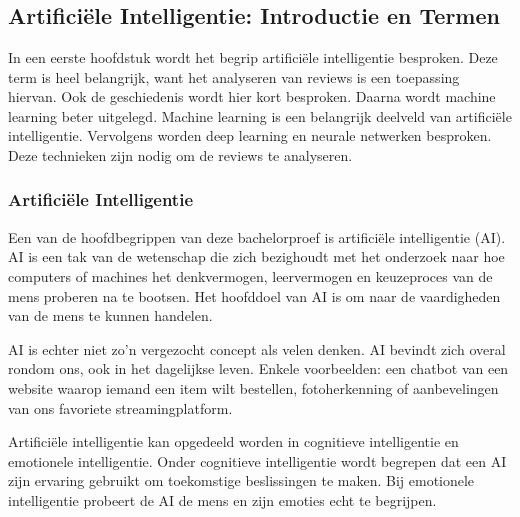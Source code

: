\chapter{}
\label{ch:stand-van-zaken}




\section{Artificiële Intelligentie: Introductie en Termen}
\label{sec:artificiëleintelligentieintroductie}
In een eerste hoofdstuk wordt het begrip artificiële intelligentie besproken. Deze term is heel belangrijk, want het analyseren van reviews is een toepassing hiervan. Ook de geschiedenis wordt hier kort besproken. Daarna wordt machine learning beter uitgelegd. Machine learning is een belangrijk deelveld van artificiële intelligentie. Vervolgens worden deep learning en neurale netwerken besproken. Deze technieken zijn nodig om de reviews te analyseren. 

\subsection{Artificiële Intelligentie}
\label{sec:artificiëleintelligentie}
Een van de hoofdbegrippen van deze bachelorproef is artificiële intelligentie (AI). \gls{AI} is een tak van de wetenschap die zich bezighoudt met het onderzoek naar hoe computers of machines het denkvermogen, leervermogen en keuzeproces van de mens proberen na te bootsen. Het hoofddoel van AI is om naar de vaardigheden van de mens te kunnen handelen. \autocite{IBM2021}

AI is echter niet zo’n vergezocht concept als velen denken. AI bevindt zich overal rondom ons, ook in het dagelijkse leven. Enkele voorbeelden: een chatbot van een website waarop iemand een item wilt bestellen, fotoherkenning of aanbevelingen van ons favoriete streamingplatform. \autocite{IBM2021}

Artificiële intelligentie kan opgedeeld worden in cognitieve intelligentie en emotionele intelligentie. Onder cognitieve intelligentie wordt begrepen dat een AI zijn ervaring gebruikt om toekomstige beslissingen te maken. Bij emotionele intelligentie probeert de AI de mens en zijn emoties echt te begrijpen. \autocite{Andreas2018}

